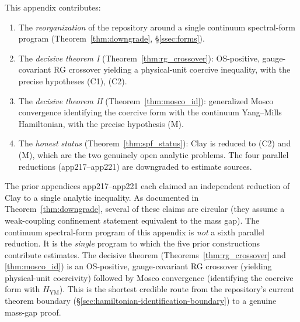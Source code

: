 \begin{remark}
\label{rem:spf_new}
This appendix contributes:
\begin{enumerate}
\item The \emph{reorganization} of the repository around a single
continuum spectral-form program
(Theorem~\ref{thm:downgrade}, \S\ref{ssec:forms}).
\item The \emph{decisive theorem I} (Theorem~\ref{thm:rg_crossover}):
OS-positive, gauge-covariant RG crossover yielding a physical-unit
coercive inequality, with the precise hypotheses (C1), (C2).
\item The \emph{decisive theorem II} (Theorem~\ref{thm:mosco_id}):
generalized Mosco convergence identifying the coercive form with
the continuum Yang--Mills Hamiltonian, with the precise hypothesis
(M).
\item The \emph{honest status} (Theorem~\ref{thm:spf_status}):
Clay is reduced to (C2) and (M), which are the two genuinely open
analytic problems. The four parallel reductions (app217--app221)
are downgraded to estimate sources.
\end{enumerate}
\end{remark}

\begin{remark}
\label{rem:spf_vs_prior}
The prior appendices app217--app221 each claimed an independent
reduction of Clay to a single analytic inequality. As documented in
Theorem~\ref{thm:downgrade}, several of these claims are circular
(they assume a weak-coupling confinement statement equivalent to
the mass gap). The continuum spectral-form program of this
appendix is \emph{not} a sixth parallel reduction. It is the
\emph{single} program to which the five prior constructions
contribute estimates. The decisive theorem
(Theorems~\ref{thm:rg_crossover} and \ref{thm:mosco_id}) is an
OS-positive, gauge-covariant RG crossover (yielding physical-unit
coercivity) followed by Mosco convergence (identifying the coercive
form with $H_{\mathrm{YM}}$). This is the shortest credible route
from the repository's current theorem boundary
(\S\ref{sec:hamiltonian-identification-boundary}) to a genuine
mass-gap proof.
\end{remark}

